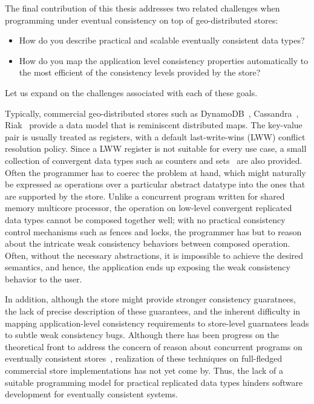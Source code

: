 The final contribution of this thesis addresses two related challenges when
programming under eventual consistency on top of geo-distributed stores:

\begin{itemize}
\item How do you describe practical and scalable eventually consistent data types?
\item How do you map the application level consistency properties automatically
to the most efficient of the consistency levels provided by the store?
\end{itemize}

Let us expand on the challenges associated with each of these goals.

Typically, commercial geo-distributed stores such as DynamoDB~\cite{DynamoDB},
Cassandra~\cite{Lakshman2010}, Riak~\cite{Riak} provide a data model that is
reminiscent distributed maps. The key-value pair is usually treated as
registers, with a default last-write-wins (LWW) conflict resolution policy.
Since a LWW register is not suitable for every use case, a small collection of
convergent data types such as counters and sets~\cite{SSS} are also provided.
Often the programmer has to coerec the problem at hand, which might naturally
be expressed as operations over a particular abstract datatype into the ones
that are supported by the store. Unlike a concurrent program written for shared
memory multicore processor, the operation on low-level convergent replicated
data types cannot be composed together well; with no practical consistency
control mechanisms such as fences and locks, the programmer has but to reason
about the intricate weak consistency behaviors between composed operation.
Often, without the necessary abstractions, it is impossible to achieve the
desired semantics, and hence, the application ends up exposing the weak
consistency behavior to the user.

In addition, although the store might provide stronger consistency guaratnees,
the lack of precise description of these guarantees, and the inherent
difficulty in mapping application-level consistency requirements to store-level
guarnatees leads to subtle weak consistency bugs. Although there has been
progress on the theoretical front to address the concern of reason about
concurrent programs on eventually consistent stores~\cite{}, realization of
these techniques on full-fledged commercial store implementations has not yet
come by. Thus, the lack of a suitable programming model for practical
replicated data types hinders software development for eventually consistent
systems.

